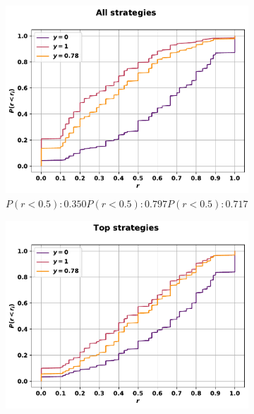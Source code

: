 \begin{table}[!htbp]
    \begin{center}
    \resizebox{.9\textwidth}{!}{
        
    }
\end{center}
\end{table}

\begin{figure}[!htbp]
    \begin{subfigure}{.45\textwidth}
    \includegraphics[width=\textwidth]{src/chapters/07/img/cfd_to_sequence_all_strategies.pdf}
    \caption{\(P(r<0.5): 0.350 P(r<0.5): 0.797 P(r<0.5): 0.717\)}
    \end{subfigure}\hfill
    \begin{subfigure}{.45\textwidth}
    \includegraphics[width=\textwidth]{src/chapters/07/img/cfd_to_sequence_top_strategies.pdf}

\end{subfigure}
\end{figure}
